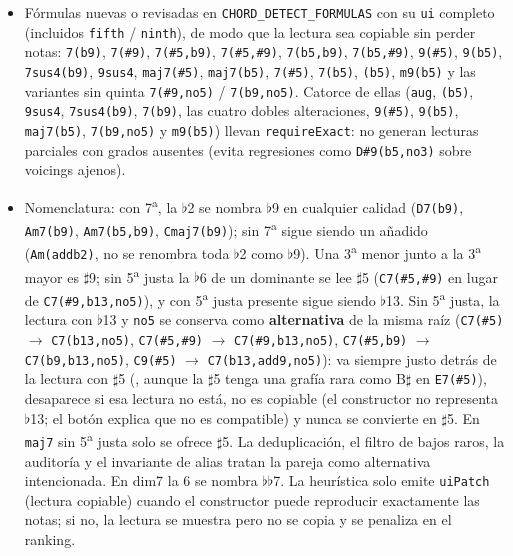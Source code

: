 \documentclass[a4paper,11pt,oneside]{report}
\newcommand{\flt}{\ensuremath{\flat}}
\newcommand{\shp}{\ensuremath{\sharp}}
\begin{document}
\begin{itemize}
\item Fórmulas nuevas o revisadas en \lstinline!CHORD_DETECT_FORMULAS! con su \lstinline!ui! completo (incluidos \lstinline!fifth! / \lstinline!ninth!), de modo que la lectura sea copiable sin perder notas: \lstinline!7(b9)!, \lstinline!7(#9)!, \lstinline!7(#5,b9)!, \lstinline!7(#5,#9)!, \lstinline!7(b5,b9)!, \lstinline!7(b5,#9)!, \lstinline!9(#5)!, \lstinline!9(b5)!, \lstinline!7sus4(b9)!, \lstinline!9sus4!, \lstinline!maj7(#5)!, \lstinline!maj7(b5)!, \lstinline!7(#5)!, \lstinline!7(b5)!, \lstinline!(b5)!, \lstinline!m9(b5)! y las variantes sin quinta \lstinline!7(#9,no5)! / \lstinline!7(b9,no5)!. Catorce de ellas (\lstinline!aug!, \lstinline!(b5)!, \lstinline!9sus4!, \lstinline!7sus4(b9)!, \lstinline!7(b9)!, las cuatro dobles alteraciones, \lstinline!9(#5)!, \lstinline!9(b5)!, \lstinline!maj7(b5)!, \lstinline!7(b9,no5)! y \lstinline!m9(b5)!) llevan \lstinline!requireExact!: no generan lecturas parciales con grados ausentes (evita regresiones como \lstinline!D#9(b5,no3)! sobre voicings ajenos).
\item Nomenclatura: con 7\textsuperscript{a}, la \flt2 se nombra \flt9 en cualquier calidad (\lstinline!D7(b9)!, \lstinline!Am7(b9)!, \lstinline!Am7(b5,b9)!, \lstinline!Cmaj7(b9)!); sin 7\textsuperscript{a} sigue siendo un añadido (\lstinline!Am(addb2)!, no se renombra toda \flt2 como \flt9). Una 3\textsuperscript{a} menor junto a la 3\textsuperscript{a} mayor es \shp9; sin 5\textsuperscript{a} justa la \flt6 de un dominante se lee \shp5 (\lstinline!C7(#5,#9)! en lugar de \lstinline!C7(#9,b13,no5)!), y con 5\textsuperscript{a} justa presente sigue siendo \flt13. Sin 5\textsuperscript{a} justa, la lectura con \flt13 y \lstinline!no5! se conserva como \textbf{alternativa} de la misma raíz (\lstinline!C7(#5)! $\to$ \lstinline!C7(b13,no5)!, \lstinline!C7(#5,#9)! $\to$ \lstinline!C7(#9,b13,no5)!, \lstinline!C7(#5,b9)! $\to$ \lstinline!C7(b9,b13,no5)!, \lstinline!C9(#5)! $\to$ \lstinline!C7(b13,add9,no5)!): va siempre justo detrás de la lectura con \shp5 (\texttt{}, aunque la \shp5 tenga una grafía rara como B\shp{} en \lstinline!E7(#5)!), desaparece si esa lectura no está, no es copiable (el constructor no representa \flt13; el botón explica que no es compatible) y nunca se convierte en \shp5. En \lstinline!maj7! sin 5\textsuperscript{a} justa solo se ofrece \shp5. La deduplicación, el filtro de bajos raros, la auditoría y el invariante de alias tratan la pareja como alternativa intencionada. En dim7 la 6 se nombra \flt\flt7. La heurística solo emite \lstinline!uiPatch! (lectura copiable) cuando el constructor puede reproducir exactamente las notas; si no, la lectura se muestra pero no se copia y se penaliza en el ranking.

\end{itemize}
\end{document}
